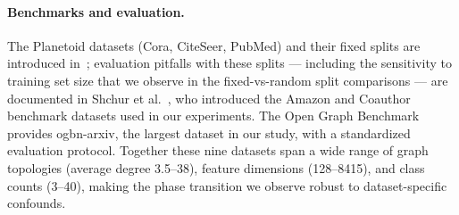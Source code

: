 \documentclass[11pt]{article}
\begin{document}
\paragraph{Benchmarks and evaluation.}
The Planetoid datasets (Cora, CiteSeer, PubMed) and their fixed splits are
introduced in~\citep{yang2016revisiting}; evaluation pitfalls with these
splits — including the sensitivity to training set size that we observe in
the fixed-vs-random split comparisons — are documented in
Shchur et al.~\citep{shchur2018pitfalls}, who introduced the Amazon and
Coauthor benchmark datasets used in our experiments.
The Open Graph Benchmark~\citep{hu2020opengraphbenchmark} provides ogbn-arxiv,
the largest dataset in our study, with a standardized evaluation protocol.
Together these nine datasets span a wide range of graph topologies (average
degree 3.5--38), feature dimensions (128--8415), and class counts (3--40),
making the phase transition we observe robust to dataset-specific confounds.



\end{document}
